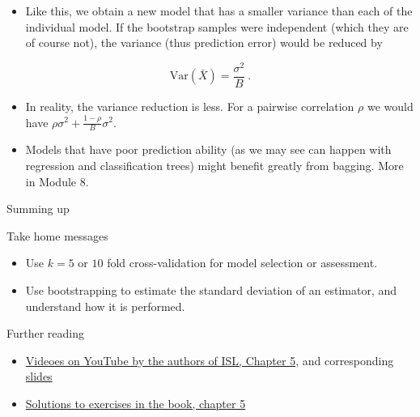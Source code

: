\documentclass[10pt,ignorenonframetext,]{beamer}
\providecommand{\tightlist}{%
  \setlength{\itemsep}{0pt}\setlength{\parskip}{0pt}}
\begin{document}
\begin{frame}

\begin{itemize}
\tightlist
\item
  Like this, we obtain a new model that has a smaller variance than each
  of the individual model. If the bootstrap samples were independent
  (which they are of course not), the variance (thus prediction error)
  would be reduced by
\end{itemize}

\[\text{Var}(\bar{X})=\frac{\sigma^2}{B} \ .\] \vspace{2mm}

\begin{itemize}
\tightlist
\item
  In reality, the variance reduction is less. For a pairwise correlation
  \(\rho\) we would have \(\rho\sigma^2 + \frac{1-\rho}{B}\sigma^2\).
\end{itemize}

\vspace{2mm}

\begin{itemize}
\tightlist
\item
  Models that have poor prediction ability (as we may see can happen
  with regression and classification trees) might benefit greatly from
  bagging. More in Module 8.
\end{itemize}

\end{frame}

\begin{frame}{Summing up}

\begin{block}{Take home messages}

\begin{itemize}
\tightlist
\item
  Use \(k=5\) or \(10\) fold cross-validation for model selection or
  assessment.
\item
  Use bootstrapping to estimate the standard deviation of an estimator,
  and understand how it is performed.
\end{itemize}

\end{block}

\end{frame}

\begin{frame}{Further reading}

\begin{itemize}
\tightlist
\item
  \href{https://www.youtube.com/playlist?list=PL5-da3qGB5IA6E6ZNXu7dp89_uv8yocmf}{Videoes
  on YouTube by the authors of ISL, Chapter 5}, and corresponding
  \href{https://lagunita.stanford.edu/c4x/HumanitiesScience/StatLearning/asset/cv_boot.pdf}{slides}
\item
  \href{https://rstudio-pubs-static.s3.amazonaws.com/65561_43c0eaaa8565414eae333b47038f716c.html}{Solutions
  to exercises in the book, chapter 5}
\end{itemize}

\end{frame}
\end{document}
